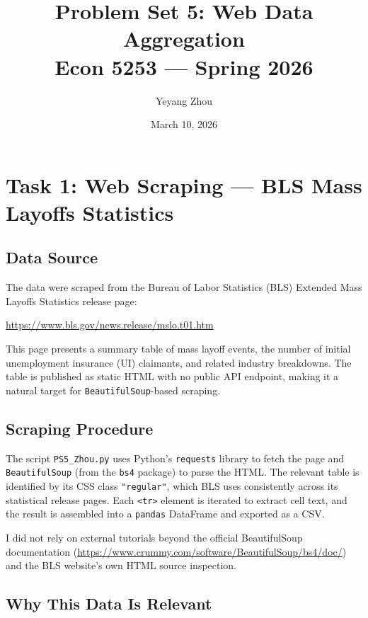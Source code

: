 \documentclass[12pt]{article}
\title{Problem Set 5: Web Data Aggregation\\
       \large Econ 5253 --- Spring 2026}
\author{Yeyang Zhou}
\date{March 10, 2026}
\begin{document}
\maketitle

\section{Task 1: Web Scraping --- BLS Mass Layoffs Statistics}

\subsection*{Data Source}

The data were scraped from the Bureau of Labor Statistics (BLS) Extended Mass
Layoffs Statistics release page:
\begin{center}
\url{https://www.bls.gov/news.release/mslo.t01.htm}
\end{center}
This page presents a summary table of mass layoff events, the number of initial
unemployment insurance (UI) claimants, and related industry breakdowns. The table
is published as static HTML with no public API endpoint, making it a natural
target for \texttt{BeautifulSoup}-based scraping.

\subsection*{Scraping Procedure}

The script \texttt{PS5\_Zhou.py} uses Python's \texttt{requests} library to
fetch the page and \texttt{BeautifulSoup} (from the \texttt{bs4} package) to
parse the HTML. The relevant table is identified by its CSS class
\texttt{"regular"}, which BLS uses consistently across its statistical release
pages. Each \texttt{<tr>} element is iterated to extract cell text, and the
result is assembled into a \texttt{pandas} DataFrame and exported as a CSV.

I did not rely on external tutorials beyond the official BeautifulSoup
documentation (\url{https://www.crummy.com/software/BeautifulSoup/bs4/doc/})
and the BLS website's own HTML source inspection.

\subsection*{Why This Data Is Relevant}
\end{document}
